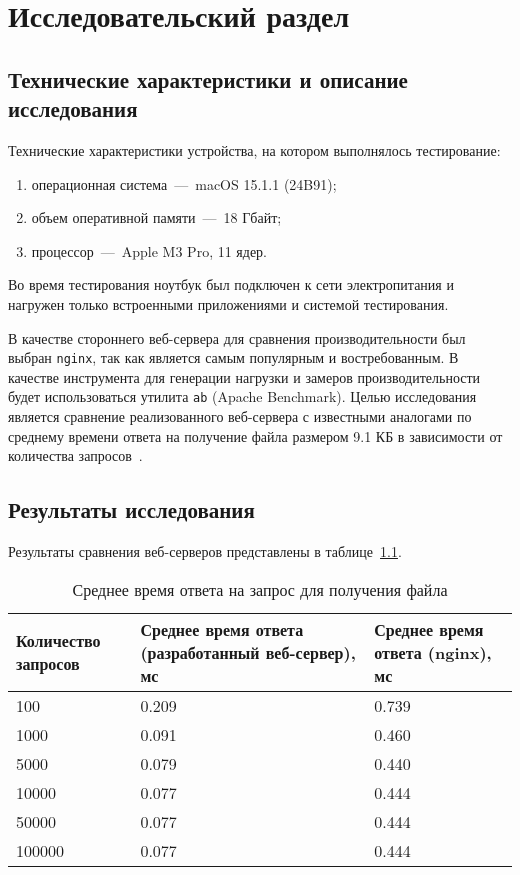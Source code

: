 \chapter{Исследовательский раздел}

\section{Технические характеристики и описание исследования}

Технические характеристики устройства, на котором выполнялось тестирование:
\begin{enumerate}
	\item операционная система~---~macOS 15.1.1 (24B91); 
	\item объем оперативной памяти~---~18 Гбайт;
	\item процессор~---~Apple M3 Pro, 11 ядер.
\end{enumerate}

Во время тестирования ноутбук был подключен к сети электропитания и нагружен только встроенными приложениями и системой тестирования.

В качестве стороннего веб-сервера для сравнения производительности был выбран \texttt{nginx}, так как является самым популярным и востребованным.
В качестве инструмента для генерации нагрузки и замеров производительности будет использоваться утилита \texttt{ab} (Apache Benchmark).
Целью исследования является сравнение реализованного веб-сервера с известными аналогами по среднему времени ответа на получение файла размером 9.1 КБ в зависимости от количества запросов~\cite{nginx}.

\clearpage
\section{Результаты исследования}

Результаты сравнения веб-серверов представлены в таблице~\ref{table1}.
\begin{table}[!ht]
	\centering
	\caption{Среднее время ответа на запрос для получения файла}
	\label{table1}
	\begin{tabularx}{\textwidth}{|X|X|X|}
		\hline
		Количество запросов & Среднее время ответа (разработанный веб-сервер), мс & Среднее время ответа (nginx), мс \\ \hline
		100 & 0.209 & 0.739 \\ \hline
		1000 & 0.091 & 0.460 \\ \hline
		5000 & 0.079 & 0.440 \\ \hline
		10000 & 0.077 & 0.444 \\ \hline
		50000 & 0.077 & 0.444 \\ \hline
		100000 & 0.077 & 0.444 \\ \hline
	\end{tabularx}
\end{table}

